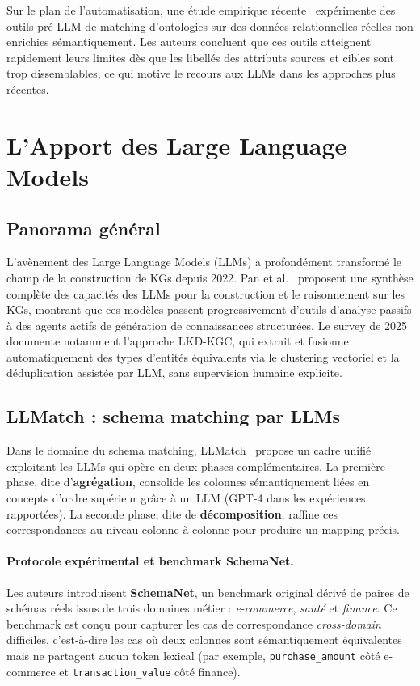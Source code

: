 Sur le plan de l'automatisation, une étude empirique récente~\cite{uncertainty_ontology_matching_2024} expérimente des outils pré-LLM de matching d'ontologies sur des données relationnelles réelles non enrichies sémantiquement. Les auteurs concluent que ces outils atteignent rapidement leurs limites dès que les libellés des attributs sources et cibles sont trop dissemblables, ce qui motive le recours aux LLMs dans les approches plus récentes.

\section{L'Apport des Large Language Models}\label{sec:llms}
\subsection{Panorama général}
L'avènement des Large Language Models (LLMs) a profondément transformé le champ de la construction de KGs depuis 2022. Pan et al.~\cite{pan2024llm_kg} proposent une synthèse complète des capacités des LLMs pour la construction et le raisonnement sur les KGs, montrant que ces modèles passent progressivement d'outils d'analyse passifs à des agents actifs de génération de connaissances structurées. Le survey de 2025~\cite{llm_kg_survey_2025} documente notamment l'approche LKD-KGC, qui extrait et fusionne automatiquement des types d'entités équivalents via le clustering vectoriel et la déduplication assistée par LLM, sans supervision humaine explicite.

\subsection{LLMatch : schema matching par LLMs}

Dans le domaine du schema matching, LLMatch~\cite{llmatch2025}
propose un cadre unifié exploitant les LLMs qui opère en deux phases
complémentaires.
La première phase, dite d'\textbf{agrégation}, consolide les colonnes
sémantiquement liées en concepts d'ordre supérieur grâce à un LLM
(GPT-4 dans les expériences rapportées).
La seconde phase, dite de \textbf{décomposition}, raffine ces
correspondances au niveau colonne-à-colonne pour produire un mapping
précis.

\paragraph{Protocole expérimental et benchmark SchemaNet.}
Les auteurs introduisent \textbf{SchemaNet}, un benchmark original
dérivé de paires de schémas réels issus de trois domaines métier :
\textit{e-commerce}, \textit{santé} et \textit{finance}.
Ce benchmark est conçu pour capturer les cas de correspondance
\textit{cross-domain} difficiles, c'est-à-dire les cas où deux
colonnes sont sémantiquement équivalentes mais ne partagent aucun
token lexical (par exemple, \texttt{purchase\_amount}
côté e-commerce et \texttt{transaction\_value}
côté finance).


